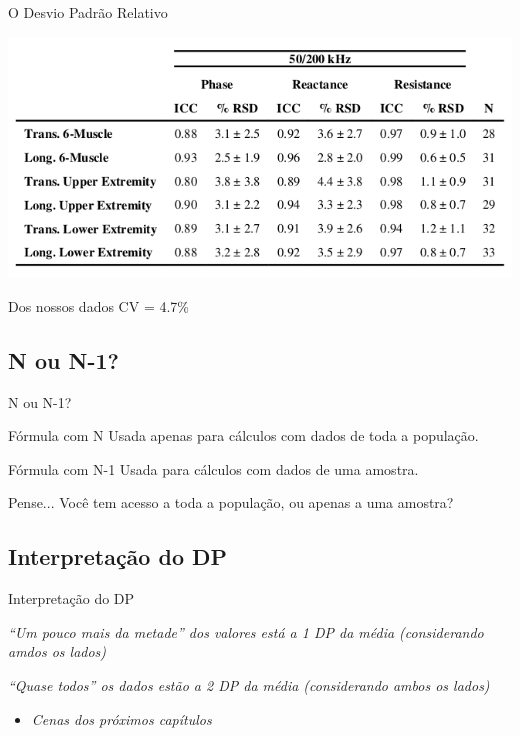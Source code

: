 \documentclass{beamer}
\begin{document}
\begin{frame}{O Desvio Padrão Relativo}
  \begin{center}
    \includegraphics[width=\textwidth]{Cap3/RSD1}
  \end{center}
  \begin{exampleblock}{Dos nossos dados}
    CV = 4.7\%
  \end{exampleblock}
\end{frame}

\subsection{N ou N-1?}

\begin{frame}{N ou N-1?}
  \begin{block}{Fórmula com N}
    Usada apenas para cálculos com dados de toda a população.
  \end{block}
  \begin{block}{Fórmula com N-1}
    Usada para cálculos com dados de uma amostra.
  \end{block}
  \begin{block}{Pense...}
      Você tem acesso a toda a população, ou apenas a uma amostra?
  \end{block}
\end{frame}

\subsection{Interpretação do DP}

\begin{frame}{Interpretação do DP}
  \begin{block}{}
    {\em ``Um pouco mais da metade'' dos valores está a 1 DP da média (considerando amdos os lados)}
  \end{block}
  \begin{block}{}
    {\em ``Quase todos'' os dados estão a 2 DP da média (considerando ambos os lados)}
  \end{block}
  \begin{itemize}
  \item {\em Cenas dos próximos capítulos}
  \end{itemize}
\end{frame}
\end{document}
